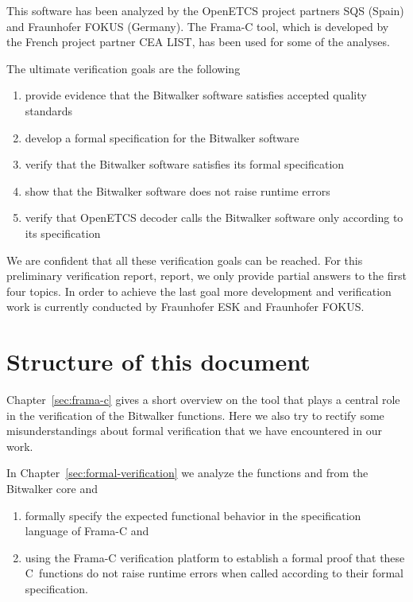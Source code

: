 This software has been analyzed by the OpenETCS project partners SQS (Spain)
and Fraunhofer FOKUS (Germany).
The Frama-C tool, which is developed by the French project partner {CEA LIST},
has been used for some of the analyses.

\clearpage

The ultimate verification goals are the following

\begin{enumerate}
\item provide evidence that the Bitwalker software satisfies 
      accepted quality standards
\item develop a formal specification for the Bitwalker software
\item verify that the Bitwalker software satisfies its formal specification
\item show that the Bitwalker software does not raise runtime errors
\item verify that OpenETCS decoder calls the Bitwalker software only
      according to its specification
\end{enumerate}

We are confident that all these verification goals can be reached.
For this preliminary verification report, report,
we only provide partial answers to the first four topics.
In order to achieve the last goal more development and verification
work is currently conducted by Fraunhofer ESK and Fraunhofer FOKUS. 

\section*{Structure of this document}

Chapter~\ref{sec:frama-c} gives a short overview on the \framacwp tool
that plays a central role in the verification of the Bitwalker functions.
Here we also try to rectify some misunderstandings about formal verification
that we have encountered in our work.

In Chapter~\ref{sec:formal-verification} we analyze
the functions \peek and \poke from the Bitwalker core and
\begin{enumerate}
\item formally specify the
      expected functional behavior in the \acsl specification language of {Frama-C}
      and
\item using the {Frama-C} verification platform to establish a formal proof that these
      C~functions do not raise runtime errors when called according to their
      formal specification.
\end{enumerate}

